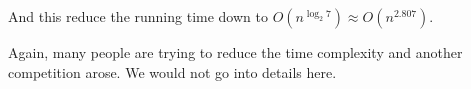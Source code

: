 \begin{spacing}{1.3}
    And this reduce the running time down to 
    $O(n^{\log_2 7})\approx O(n^{2.807})$.

    Again, many people are trying to reduce the time complexity 
    and another competition arose. 
    We would not go into details here.


\end{spacing}
